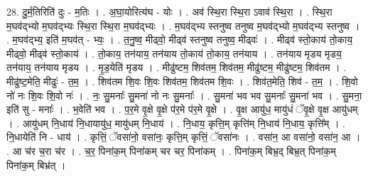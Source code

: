 \documentclass[17pt]{extarticle}
\begin{document}
28. दु॒र्म॒तिरिति॑ दुः - म॒तिः । . अ॒घा॒योरित्य॑घ - योः । . अव॑ स्थि॒रा स्थि॒रा ऽवाव॑ स्थि॒रा । . स्थि॒रा म॒घव॑द्भ्यो म॒घव॑द्भ्यः स्थि॒रा स्थि॒रा म॒घव॑द्भ्यः । . म॒घव॑द्भ्य स्तनुष्व तनुष्व म॒घव॑द्भ्यो म॒घव॑द्भ्य स्तनुष्व । . म॒घव॑द्भ्य॒ इति॑ म॒घव॑त् - भ्यः॒ । . त॒नु॒ष्व॒ मीढ्वो॒ मीढ्व॑ स्तनुष्व तनुष्व॒ मीढ्वः॑ । . मीढ्व॑ स्तो॒काय॑ तो॒काय॒ मीढ्वो॒ मीढ्व॑ स्तो॒काय॑ । . तो॒काय॒ तन॑याय॒ तन॑याय तो॒काय॑ तो॒काय॒ तन॑याय । . तन॑याय मृडय मृडय॒ तन॑याय॒ तन॑याय मृडय । . मृ॒ड॒येति॑ मृडय । . मीढु॑ष्टम॒ शिव॑तम॒ शिव॑तम॒ मीढु॑ष्टम॒ मीढु॑ष्टम॒ शिव॑तम । . मीढु॑ष्ट॒मेति॒ मीढुः॑ - त॒म॒ । . शिव॑तम शि॒वः शि॒वः शिव॑तम॒ शिव॑तम शि॒वः । . शिव॑त॒मेति॒ शिव॑ - त॒म॒ । . शि॒वो नो॑ नः शि॒वः शि॒वो नः॑ । . नः॒ सु॒मनाः᳚ सु॒मना॑ नो नः सु॒मनाः᳚ । . सु॒मना॑ भव भव सु॒मनाः᳚ सु॒मना॑ भव । . सु॒मना॒ इति॑ सु - मनाः᳚ । . भ॒वेति॑ भव । . प॒र॒मे वृ॒क्षे वृ॒क्षे प॑र॒मे प॑र॒मे वृ॒क्षे । . वृ॒क्ष आयु॑ध॒ मायु॑धं ॅवृ॒क्षे वृ॒क्ष आयु॑धम् । . आयु॑धम् नि॒धाय॑ नि॒धायायु॑ध॒ मायु॑धम् नि॒धाय॑ । . नि॒धाय॒ कृत्ति॒म् कृत्ति॑म् नि॒धाय॑ नि॒धाय॒ कृत्ति᳚म् । . नि॒धायेति॑ नि - धाय॑ । . कृत्तिं॒ ॅवसा॑नो॒ वसा॑नः॒ कृत्ति॒म् कृत्तिं॒ ॅवसा॑नः । . वसा॑न॒ आ वसा॑नो॒ वसा॑न॒ आ । . आ च॑र च॒रा च॑र । . च॒र॒ पिना॑क॒म् पिना॑कम् चर चर॒ पिना॑कम् । . पिना॑क॒म् बिभ्र॒द् बिभ्र॒त् पिना॑क॒म् पिना॑क॒म् बिभ्र॑त् । \newline
\end{document}

